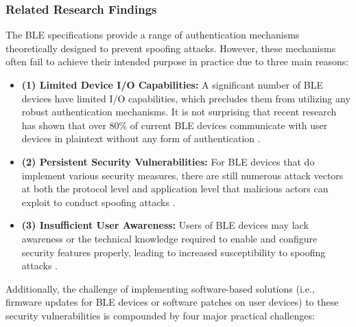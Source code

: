 \subsubsection{Related Research Findings}

\noindent The BLE specifications \cite{specification} provide a range of authentication mechanisms theoretically designed to prevent spoofing attacks. However, these mechanisms often fail to achieve their intended purpose in practice due to three main reasons: 

\begin{itemize}[leftmargin=0.1cm]
    \setlength{\itemsep}{-0.1cm}
    \item \textbf{(1) Limited Device I/O Capabilities: }A significant number of BLE devices have limited I/O capabilities, which precludes them from utilizing any robust authentication mechanisms. It is not surprising that recent research has shown that over 80\% of current BLE devices communicate with user devices in plaintext without any form of authentication \cite{bsecurity}.
    \item \textbf{(2) Persistent Security Vulnerabilities:} For BLE devices that do implement various security measures, there are still numerous attack vectors at both the protocol level and application level that malicious actors can exploit to conduct spoofing attacks \cite{wu2020blueshield}.
    \item \textbf{(3) Insufficient User Awareness:} Users of BLE devices may lack awareness or the technical knowledge required to enable and configure security features properly, leading to increased susceptibility to spoofing attacks \cite{casar2022survey}.
\end{itemize}

\vspace{-4pt}

\noindent Additionally, the challenge of implementing software-based solutions (i.e., firmware updates for BLE devices or software patches on user devices) to these security vulnerabilities is compounded by four major practical challenges:

\vspace{-4pt}

